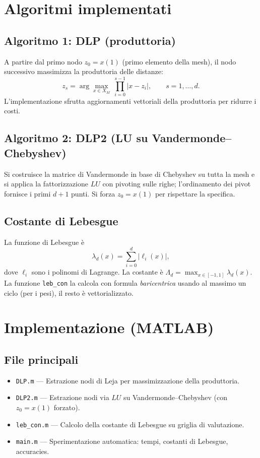 \documentclass[12pt]{article}
\newcommand{\abs}[1]{\left|#1\right|}
\begin{document}
\section{Algoritmi implementati}

\subsection{Algoritmo 1: DLP (produttoria)}
A partire dal primo nodo \(z_0=x(1)\) (primo elemento della mesh), il nodo successivo massimizza la produttoria delle distanze:
\[
z_s=\arg\max_{x\in X_M}\ \prod_{i=0}^{s-1}\abs{x-z_i},\qquad s=1,\dots,d.
\]
L'implementazione sfrutta aggiornamenti vettoriali della produttoria per ridurre i costi.

\subsection{Algoritmo 2: DLP2 (LU su Vandermonde--Chebyshev)}
Si costruisce la matrice di Vandermonde in base di Chebyshev su tutta la mesh e si applica la fattorizzazione \(LU\) con pivoting sulle righe; l'ordinamento dei pivot fornisce i primi \(d{+}1\) punti. Si forza \(z_0=x(1)\) per rispettare la specifica.

\subsection{Costante di Lebesgue}
La funzione di Lebesgue è
\[
\lambda_d(x)=\sum_{i=0}^d \abs{\ell_i(x)},
\]
dove \(\ell_i\) sono i polinomi di Lagrange. La costante è \(\Lambda_d=\max_{x\in[-1,1]}\lambda_d(x)\). La funzione \texttt{leb\_con} la calcola con formula \emph{baricentrica} usando al massimo un ciclo (per i pesi), il resto è vettorializzato.

\section{Implementazione (MATLAB)}

\subsection*{File principali}
\begin{itemize}
  \item \texttt{DLP.m} --- Estrazione nodi di Leja per massimizzazione della produttoria.
  \item \texttt{DLP2.m} --- Estrazione nodi via \(LU\) su Vandermonde--Chebyshev (con \(z_0=x(1)\) forzato).
  \item \texttt{leb\_con.m} --- Calcolo della costante di Lebesgue su griglia di valutazione.
  \item \texttt{main.m} --- Sperimentazione automatica: tempi, costanti di Lebesgue, accuracies.
\end{itemize}
\end{document}
